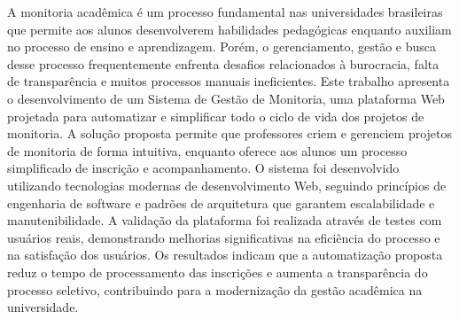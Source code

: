 \documentclass[portuguese]{sbc2025}%
\begin{document}
\begin{frontmatter}

\begin{abstract-pt}
A monitoria acadêmica é um processo fundamental nas universidades brasileiras que permite aos alunos desenvolverem habilidades pedagógicas enquanto auxiliam no processo de ensino e aprendizagem. Porém, o gerenciamento, gestão e busca desse processo frequentemente enfrenta desafios relacionados à burocracia, falta de transparência e muitos processos manuais ineficientes. Este trabalho apresenta o desenvolvimento de um Sistema de Gestão de Monitoria, uma plataforma Web projetada para automatizar e simplificar todo o ciclo de vida dos projetos de monitoria. A solução proposta permite que professores criem e gerenciem projetos de monitoria de forma intuitiva, enquanto oferece aos alunos um processo simplificado de inscrição e acompanhamento. O sistema foi desenvolvido utilizando tecnologias modernas de desenvolvimento Web, seguindo princípios de engenharia de software e padrões de arquitetura que garantem escalabilidade e manutenibilidade. A validação da plataforma foi realizada através de testes com usuários reais, demonstrando melhorias significativas na eficiência do processo e na satisfação dos usuários. Os resultados indicam que a automatização proposta reduz o tempo de processamento das inscrições e aumenta a transparência do processo seletivo, contribuindo para a modernização da gestão acadêmica na universidade.
\end{abstract-pt}


\end{frontmatter}
\end{document}

